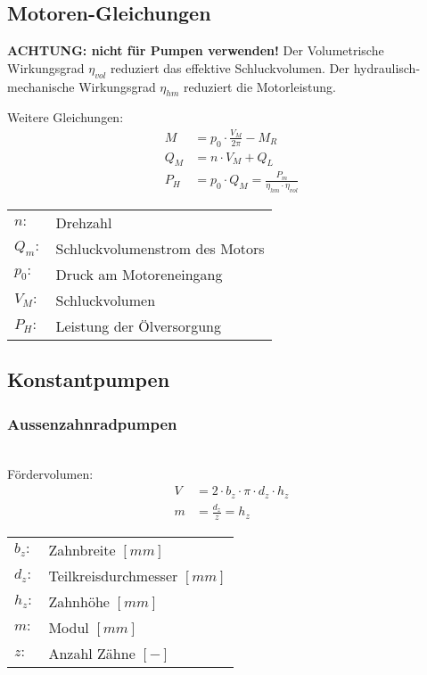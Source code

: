\subsection{Motoren-Gleichungen}
\textbf{ACHTUNG: nicht für Pumpen verwenden!}
Der Volumetrische Wirkungsgrad $\eta_{vol}$ reduziert das effektive Schluckvolumen. Der hydraulisch-mechanische Wirkungsgrad $\eta_{hm}$ reduziert die Motorleistung. 


Weitere Gleichungen:
\begin{align*}
M &= p_0 \cdot \frac{V_M}{2 \pi} - M_R \tag{Lastmoment} \\
Q_M &= n \cdot V_M + Q_L \tag{Volumenstrom} \\
P_H &= p_0 \cdot Q_M = \frac{P_m}{\eta_{hm} \cdot \eta_{vol}}
\end{align*}

\begin{tabular}{ll}
$n:$ & Drehzahl \\
$Q_m:$ & Schluckvolumenstrom des Motors\\
$p_0:$ & Druck am Motoreneingang \\
$V_M:$ & Schluckvolumen \\
$P_H:$ & Leistung der Ölversorgung \\
\end{tabular}



\subsection{Konstantpumpen}


\subsubsection{Aussenzahnradpumpen}
\\
Fördervolumen: \\
\begin{align*}
V &= 2 \cdot b_z \cdot \pi \cdot d_z \cdot h_z \\
m &= \frac{d_z}{z} = h_z
\end{align*}


\begin{tabular}{ll}
$b_z:$ & Zahnbreite $[mm]$\\
$d_z:$& Teilkreisdurchmesser $[mm]$\\
$h_z:$& Zahnhöhe $[mm]$\\
$m:$& Modul $[mm]$\\
$z:$& Anzahl Zähne $[-]$
\end{tabular} \\


